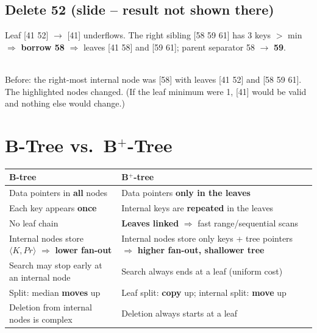 \documentclass[10pt,a4paper]{article}
\newcommand{\sep}{\,$\mid$\,}
\begin{document}
\subsection{Delete 52 (slide -- result not shown there)}
\begin{exbox}[Solution with leaf min = 2]
\small
Leaf [41 52] $\to$ [41] underflows. The right sibling [58 59 61] has 3 keys $>$ min $\Rightarrow$ \textbf{borrow 58} $\Rightarrow$ leaves [41 58] and [59 61]; parent separator 58 $\to$ \textbf{59}.

\centering
{}\\
{\scriptsize Before: the right-most internal node was [58] with leaves [41 52] and [58 59 61]. The highlighted nodes changed. (If the leaf minimum were 1, [41] would be valid and nothing else would change.)}
\end{exbox}

\section{B-Tree vs.\ B$^+$-Tree}

\begin{tabularx}{\linewidth}{@{}X X@{}}
\toprule
\textbf{B-tree} & \textbf{B$^+$-tree}\\\midrule
Data pointers in \textbf{all} nodes & Data pointers \textbf{only in the leaves}\\
Each key appears \textbf{once} & Internal keys are \textbf{repeated} in the leaves\\
No leaf chain & \textbf{Leaves linked} $\Rightarrow$ fast range/sequential scans\\
Internal nodes store $\langle K, Pr \rangle$ $\Rightarrow$ \textbf{lower fan-out} & Internal nodes store only keys + tree pointers $\Rightarrow$ \textbf{higher fan-out, shallower tree}\\
Search may stop early at an internal node & Search always ends at a leaf (uniform cost)\\
Split: median \textbf{moves} up & Leaf split: \textbf{copy} up; internal split: \textbf{move} up\\
Deletion from internal nodes is complex & Deletion always starts at a leaf\\
\bottomrule
\end{tabularx}
\end{document}
